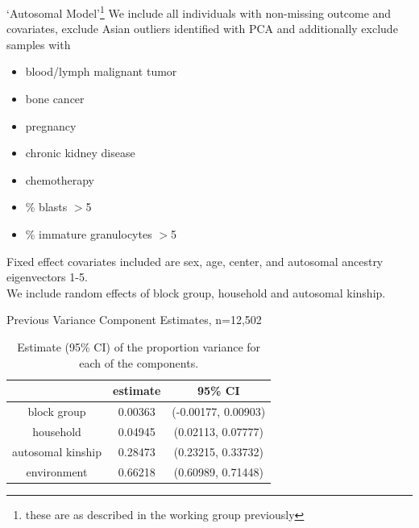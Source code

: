 \documentclass{beamer}
\begin{document}
\begin{frame}{`Autosomal Model'\footnote{these are as described in the working group previously}}
We include all individuals with non-missing outcome and covariates, exclude Asian outliers identified with PCA and additionally exclude samples with
\begin{itemize}
\item blood/lymph malignant tumor
\item bone cancer
\item pregnancy
\item chronic kidney disease
\item chemotherapy
\item \% blasts $>$5
\item \% immature granulocytes $>$5
\end{itemize}
Fixed effect covariates included are sex, age, center, and autosomal ancestry eigenvectors 1-5.\\
We include random effects of block group, household and autosomal kinship.
\end{frame}

\begin{frame}{Previous Variance Component Estimates, n=12,502}
\begin{table}[h!]
\centering
\begin{tabular}{ccc}
  \hline
& estimate & 95\% CI \\ \hline
block group & 0.00363 & (-0.00177, 0.00903)\\
household &0.04945 & (0.02113, 0.07777)\\
autosomal kinship &0.28473 &(0.23215, 0.33732)\\
environment & 0.66218& (0.60989, 0.71448) \\ \hline
\end{tabular}
\caption{Estimate (95\% CI) of the proportion variance for each of the components.}
\label{table:varComp}
\end{table}
\end{frame}
\end{document}
